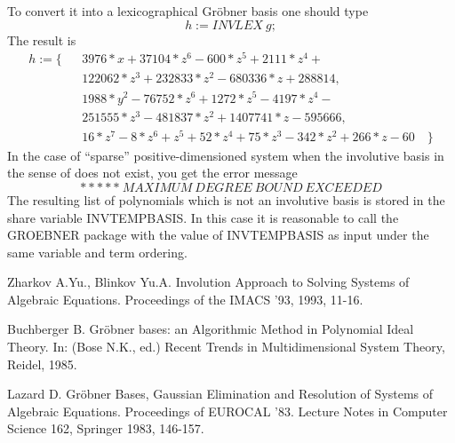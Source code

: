 To convert it into a lexicographical Gr\"obner basis one should type
$$ h:=INVLEX\>g; $$
The result is
\begin{eqnarray*}
h :=\{& &3976*x + 37104*z^6 - 600*z^5 + 2111*z^4 +  \\
& &  122062*z^3 + 232833*z^2 - 680336*z + 288814,\\
& &  1988*y^2 - 76752*z^6 + 1272*z^5 - 4197*z^4 - \\
& &  251555*z^3 - 481837*z^2 + 1407741*z - 595666,\\
& &  16*z^7 - 8*z^6 + z^5 + 52*z^4 +
     75*z^3 - 342*z^2 + 266*z - 60 \quad \}
\end{eqnarray*}
In the case of ``sparse'' positive-dimensioned system
when the involutive basis in the sense of \cite{Lille} does not exist,
you get the error message $$ *****\> MAXIMUM \> DEGREE \> BOUND \>
EXCEEDED $$ The resulting list of polynomials which is not an involutive
basis is stored in the share variable INVTEMPBASIS. In this case
it is reasonable to call the GROEBNER package with the value of
INVTEMPBASIS as input under the same variable and term ordering.

\begin{thebibliography}{99}

Zharkov A.Yu., Blinkov Yu.A. Involution Approach to Solving Systems
of Algebraic Equations. Proceedings of the IMACS '93, 1993, 11-16.

Buchberger B. Gr\"obner bases: an Algorithmic Method in Polynomial
Ideal Theory. In: (Bose N.K., ed.) Recent Trends in Multidimensional
System Theory, Reidel, 1985.

Lazard D. Gr\"obner Bases, Gaussian Elimination and Resolution of
Systems of Algebraic Equations. Proceedings of EUROCAL '83.
Lecture Notes in Computer Science 162, Springer 1983, 146-157.

\end{thebibliography}


